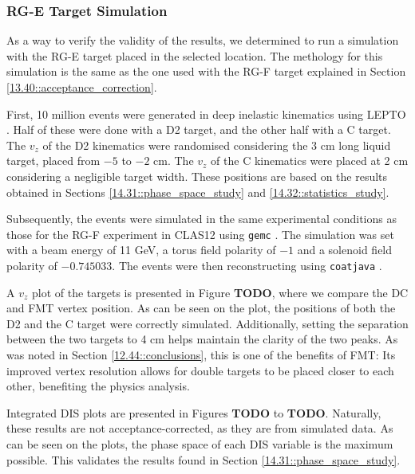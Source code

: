 \subsubsection{RG-E Target Simulation}
\label{14.33::rge_target_simulation}
    As a way to verify the validity of the results, we determined to run a simulation with the RG-E target placed in the selected location.
    The methology for this simulation is the same as the one used with the RG-F target explained in Section \ref{13.40::acceptance_correction}.

    First, 10 million events were generated in deep inelastic kinematics using LEPTO \cite{ingelman1997}.
    Half of these were done with a D2 target, and the other half with a C target.
    The $v_z$ of the D2 kinematics were randomised considering the 3 cm long liquid target, placed from $-5$ to $-2$ cm.
    The $v_z$ of the C kinematics were placed at 2 cm considering a negligible target width.
    These positions are based on the results obtained in Sections \ref{14.31::phase_space_study} and \ref{14.32::statistics_study}.

    Subsequently, the events were simulated in the same experimental conditions as those for the RG-F experiment in CLAS12 using \texttt{gemc} \cite{ungaro2020gemc}.
    The simulation was set with a beam energy of 11 GeV, a torus field polarity of $-1$ and a solenoid field polarity of $-0.745033$.
    The events were then reconstructing using \texttt{coatjava} \cite{ziegler2020}.

    A $v_z$ plot of the targets is presented in Figure \textbf{TODO}, where we compare the DC and FMT vertex position.
    As can be seen on the plot, the positions of both the D2 and the C target were correctly simulated.
    Additionally, setting the separation between the two targets to 4 cm helps maintain the clarity of the two peaks.
    As was noted in Section \ref{12.44::conclusions}, this is one of the benefits of FMT: Its improved vertex resolution allows for double targets to be placed closer to each other, benefiting the physics analysis.

    Integrated DIS plots are presented in Figures \textbf{TODO} to \textbf{TODO}.
    Naturally, these results are not acceptance-corrected, as they are from simulated data.
    As can be seen on the plots, the phase space of each DIS variable is the maximum possible.
    This validates the results found in Section \ref{14.31::phase_space_study}.

